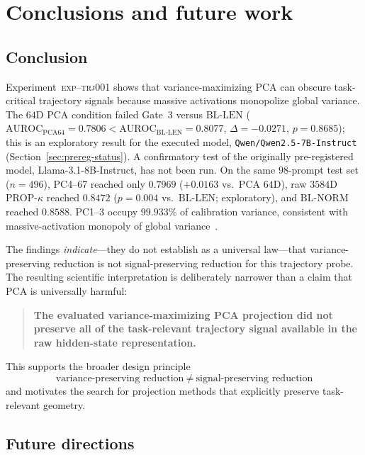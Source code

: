 \documentclass{article}
\newcommand{\auroc}{\mathrm{AUROC}}
\newcommand{\propk}{\mathrm{PROP}\text{-}\kappa}
\newcommand{\bllen}{\mathrm{BL\text{-}LEN}}
\newcommand{\blnorm}{\mathrm{BL\text{-}NORM}}
\newcommand{\exptag}{\textsc{exp--trj001}}
\begin{document}
\section{Conclusions and future work}
\label{sec:concl}

\subsection{Conclusion}
\label{sec:concl-main}

Experiment~\exptag{} shows that variance-maximizing {PCA} can obscure task-critical trajectory signals because massive activations monopolize global variance.
The $64${D} {PCA} condition failed Gate~3 versus $\bllen$ ($\auroc_{\mathrm{PCA64}}=0.7806<\auroc_{\bllen}=0.8077$, $\Delta=-0.0271$, $p=0.8685$); this is an exploratory result for the executed model, \texttt{Qwen/Qwen2.5-7B-Instruct} (Section~\ref{sec:prereg-status}). A confirmatory test of the originally pre-registered model, {Llama-3.1-8B-Instruct}, has not been run.
On the same $98$-prompt test set ($n=496$), {PC4}--{67} reached only $0.7969$ ($+0.0163$ vs.\ {PCA} $64${D}), raw $3584${D} $\propk$ reached $0.8472$ ($p=0.004$ vs.\ $\bllen$; exploratory), and $\blnorm$ reached $0.8588$.
{PC1}--{3} occupy $99.933\%$ of calibration variance, consistent with massive-activation monopoly of global variance~\citep{sun2024massive}.

The findings \emph{indicate}---they do not establish as a universal law---that variance-preserving reduction is not signal-preserving reduction for this trajectory probe. The resulting scientific interpretation is deliberately narrower than a claim that {PCA} is universally harmful:
\begin{quote}
\textbf{The evaluated variance-maximizing {PCA} projection did not preserve all of the task-relevant trajectory signal available in the raw hidden-state representation.}
\end{quote}
This supports the broader design principle
\begin{equation}
\boxed{\
  \text{variance-preserving reduction}
  \ \neq\
  \text{signal-preserving reduction}
\ }
\label{eq:final-box}
\end{equation}
and motivates the search for projection methods that explicitly preserve task-relevant geometry.

\subsection{Future directions}
\label{sec:future}
\end{document}
